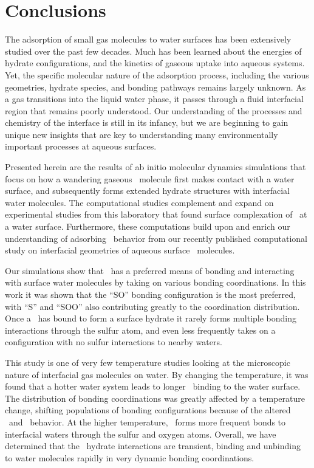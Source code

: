 \documentclass{article}
\begin{document}
\section {Conclusions}

The adsorption of small gas molecules to water surfaces has been extensively studied over the past few decades. Much has been learned about the energies of hydrate configurations, and the kinetics of gaseous uptake into aqueous systems. Yet, the specific molecular nature of the adsorption process, including the various geometries, hydrate species, and bonding pathways remains largely unknown. As a gas transitions into the liquid water phase, it passes through a fluid interfacial region that remains poorly understood. Our understanding of the processes and chemistry of the interface is still in its infancy, but we are beginning to gain unique new insights that are key to understanding many environmentally important processes at aqueous surfaces.

Presented herein are the results of ab initio molecular dynamics simulations that focus on how a wandering gaseous \suldiox~molecule first makes contact with a water surface, and subsequently forms extended hydrate structures with interfacial water molecules. The computational studies complement and expand on experimental studies from this laboratory that found surface complexation of \suldiox~at a water surface.\cite{Tarbuck2005,Tarbuck2006,Ota2011} Furthermore, these computations build upon and enrich our understanding of adsorbing \suldiox~behavior from our recently published computational study on interfacial geometries of aqueous surface \suldiox~molecules.\cite{Shamay2011}

Our simulations show that \suldiox~has a preferred means of bonding and interacting with surface water molecules by taking on various bonding coordinations. In this work it was shown that the ``SO'' bonding configuration is the most preferred, with ``S'' and ``SOO'' also contributing greatly to the coordination distribution. Once a \suldiox~has bound to form a surface hydrate it rarely forms multiple bonding interactions through the sulfur atom, and even less frequently takes on a configuration with no sulfur interactions to nearby waters.

This study is one of very few temperature studies looking at the microscopic nature of interfacial gas molecules on water. By changing the temperature, it was found that a hotter water system leads to longer \suldiox~binding to the water surface. The distribution of bonding coordinations was greatly affected by a temperature change, shifting populations of bonding configurations because of the altered \suldiox~and \wat~behavior. At the higher temperature, \suldiox~forms more frequent bonds to interfacial waters through the sulfur and oxygen atoms. Overall, we have determined that the \suldiox~hydrate interactions are transient, binding and unbinding to water molecules rapidly in very dynamic bonding coordinations.
\end{document}
